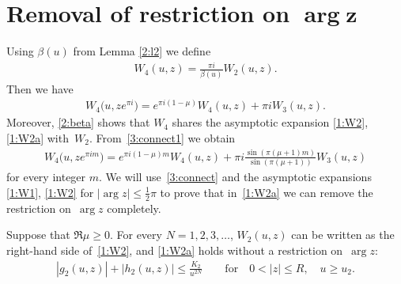 \section[Removal of restriction on $\arg z$]{Removal of restriction on $\boldsymbol{\arg z}$}\label{removal}

Using $\beta(u)$ from Lemma \ref{2:l2} we def\/ine
\begin{gather*} W_4(u,z)=\frac{\pi i}{\beta(u)} W_2(u,z) .\end{gather*}
Then we have
\begin{gather}\label{3:connect1}
W_4\big(u,ze^{\pi i}\big)=e^{\pi i(1-\mu)} W_4(u,z)+\pi i W_3(u,z) .
\end{gather}
Moreover, \eqref{2:beta} shows that $W_4$ shares the asymptotic expansion \eqref{1:W2}, \eqref{1:W2a} with~$W_2$.
From~\eqref{3:connect1} we obtain
\begin{gather}\label{3:connect}
W_4\big(u,ze^{\pi im}\big)=e^{\pi i (1-\mu)m} W_4(u,z)+\pi i\frac{\sin(\pi(\mu+1)m)}{\sin(\pi(\mu+1))} W_3(u,z)
\end{gather}
for every integer $m$.
We will use~\eqref{3:connect} and the asymptotic expansions \eqref{1:W1}, \eqref{1:W2} for $|\arg z|\le \frac12\pi$
to prove that in~\eqref{1:W2a} we can remove the restriction on~$\arg z$ completely.

\begin{Theorem}\label{3:t1}
Suppose that $\Re\mu\ge0$. For every $N=1,2,3,\dots$, $W_2(u,z)$ can be written as the right-hand side of~\eqref{1:W2},
and \eqref{1:W2a} holds without a restriction on~$\arg z$:
\begin{gather*}%
|g_2(u,z)|+|h_2(u,z)|\le \frac{K_2}{u^{2N}}\qquad\text{for} \quad 0<|z|\le R, \quad u\ge u_2.
\end{gather*}
\end{Theorem}

